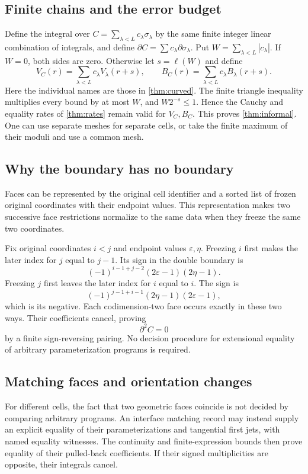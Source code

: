\subsection{Finite chains and the error budget}

Define the integral over $C=\sum_{\lambda<L}c_\lambda\sigma_\lambda$
by the same finite integer linear combination of integrals, and define
$\partial C=\sum c_\lambda\partial\sigma_\lambda$. Put
$W=\sum_{\lambda<L}|c_\lambda|$. If $W=0$, both sides are zero.
Otherwise let $s=\ell(W)$ and define
\[
 V_C(r)=\sum_{\lambda<L}c_\lambda V_\lambda(r+s),\qquad
 B_C(r)=\sum_{\lambda<L}c_\lambda B_\lambda(r+s).
\]
Here the individual names are those in \cref{thm:curved}. The finite
triangle inequality multiplies every bound by at most $W$, and
$W2^{-s}\le1$. Hence the Cauchy and equality rates of
\cref{thm:rates} remain valid for $V_C,B_C$. This proves
\cref{thm:informal}. One can use separate meshes for separate cells,
or take the finite maximum of their moduli and use a common mesh.

\subsection{Why the boundary has no boundary}

Faces can be represented by the original cell identifier and a sorted
list of frozen original coordinates with their endpoint values.
This representation makes two successive face restrictions normalize
to the same data when they freeze the same two coordinates.

Fix original coordinates $i<j$ and endpoint values
$\varepsilon,\eta$. Freezing $i$ first makes the later index for $j$
equal to $j-1$. Its sign in the double boundary is
\[
 (-1)^{i-1+j-2}(2\varepsilon-1)(2\eta-1).
\]
Freezing $j$ first leaves the later index for $i$ equal to $i$.
The sign is
\[
 (-1)^{j-1+i-1}(2\eta-1)(2\varepsilon-1),
\]
which is its negative. Each codimension-two face occurs exactly in
these two ways. Their coefficients cancel, proving
\[
 \partial^2C=0
\]
by a finite sign-reversing pairing. No decision procedure for extensional
equality of arbitrary parameterization programs is required.

\subsection{Matching faces and orientation changes}

For different cells, the fact that two geometric faces coincide is not
decided by comparing arbitrary programs. An interface matching record
may instead supply an explicit equality of their parameterizations and
tangential first jets, with named equality witnesses. The continuity
and finite-expression bounds then prove equality of their pulled-back
coefficients. If their signed multiplicities are opposite, their
integrals cancel.

